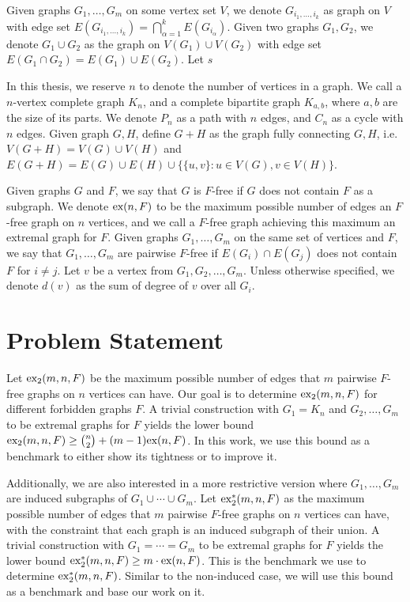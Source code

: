 \documentclass[12pt]{report}
\newcommand*{\ex}{\textnormal{ex}}
\newcommand*{\dex}{\textnormal{ex}_2}
\begin{document}
Given graphs $G_1, \ldots, G_m$ on some vertex set $V$, we denote $G_{i_1, \ldots, i_k}$ as graph on $V$ with edge set $E(G_{i_1, \ldots, i_k}) = \bigcap_{\alpha = 1}^k E(G_{i_\alpha})$. Given two graphs $G_1, G_2$, we denote $G_1 \cup G_2$ as the graph on $V(G_1) \cup V(G_2)$ with edge set $E(G_1 \cap G_2) = E(G_1) \cup E(G_2)$. Let $s$

In this thesis, we reserve $n$ to denote the number of vertices in a graph. We call a $n$-vertex complete graph $K_n$, and a complete bipartite graph $K_{a, b}$, where $a, b$ are the size of its parts. We denote $P_n$ as a path with $n$ edges, and $C_n$ as a cycle with $n$ edges. Given graph $G, H$, define $G + H$ as the graph fully connecting $G, H$, i.e. $V(G + H) = V(G) \cup V(H)$ and $E(G + H) = E(G) \cup E(H) \cup \{\{u, v\} : u \in V(G), v \in V(H)\}$.

Given graphs $G$ and $F$, we say that $G$ is $F$-free if $G$ does not contain $F$ as a subgraph. We denote $\ex(n, F)$ to be the maximum  possible number of edges an $F$-free graph on $n$ vertices, and we call a $F$-free graph achieving this maximum an extremal graph for $F$. Given graphs $G_1, \ldots, G_m$ on the same set of vertices and $F$, we say that $G_1, \ldots, G_m$ are pairwise $F$-free if $E(G_i) \cap E(G_j)$ does not contain $F$ for $i \neq j$. Let $v$ be a vertex from $G_1, G_2, \ldots, G_m$. Unless otherwise specified, we denote $d(v)$ as the sum of degree of $v$ over all $G_i$.

\section{Problem Statement}

Let $\dex(m, n, F)$ be the maximum possible number of edges that $m$ pairwise $F$-free graphs on $n$ vertices can have. Our goal is to determine $\dex(m, n, F)$ for different forbidden graphs $F$. A trivial construction with $G_1 = K_n$ and $G_2, \ldots, G_m$ to be extremal graphs for $F$ yields the lower bound $\dex(m, n, F) \geq \binom{n}{2} + (m - 1)\ex(n, F)$. In this work, we use this bound as a benchmark to either show its tightness or to improve it.

Additionally, we are also interested in a more restrictive version where $G_1, \ldots, G_m$ are induced subgraphs of $G_1 \cup \cdots \cup G_m$. Let $\dex^*(m, n, F)$ as the maximum possible number of edges that $m$ pairwise $F$-free graphs on $n$ vertices can have, with the constraint that each graph is an induced subgraph of their union. A trivial construction with $G_1 = \cdots = G_m$ to be extremal graphs for $F$ yields the lower bound $\dex^*(m, n, F) \geq m \cdot \ex(n, F)$. This is the benchmark we use to determine $\dex^*(m, n, F)$. Similar to the non-induced case, we will use this bound as a benchmark and base our work on it.
\end{document}
